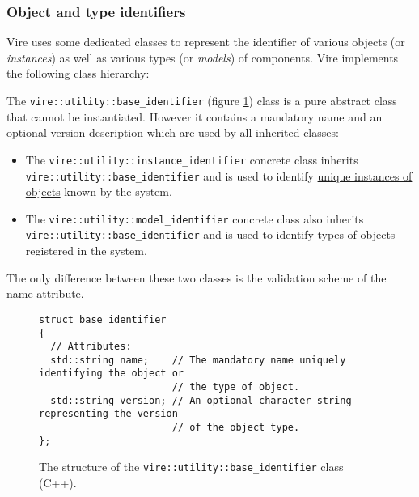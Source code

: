 \subsubsection{Object and type identifiers}

Vire  uses  some dedicated  classes  to  represent the  identifier  of
various objects  (or \emph{instances})  as well  as various  types (or
\emph{models})  of components.  Vire  implements  the following  class
hierarchy:

\begin{center}
\end{center}

The          \texttt{vire::utility::base\_identifier}          (figure
\ref{fig-app-payload-base_identifier}) class is  a pure abstract class
that cannot be instantiated. However  it contains a mandatory name and
an  optional  version description  which  are  used by  all  inherited
classes:

\begin{itemize}

\item The   \texttt{vire::utility::instance\_identifier}    concrete   class
inherits  \texttt{vire::utility::base\_identifier}  and   is  used  to
identify \underline{unique instances of objects} known by the system.

\item The  \texttt{vire::utility::model\_identifier}   concrete  class  also
inherits  \texttt{vire::utility::base\_identifier}  and   is  used  to
identify \underline{types of objects} registered in the system.

\end{itemize}

The only difference between these two classes is the validation scheme
of  the name  attribute.

\begin{figure}[h]
\vskip 10pt
\small
\begin{Verbatim}[frame=single,xleftmargin=0.cm,label=\fbox{C++}]
struct base_identifier
{
  // Attributes:
  std::string name;    // The mandatory name uniquely identifying the object or
                       // the type of object.
  std::string version; // An optional character string representing the version
                       // of the object type.
};
\end{Verbatim}
\normalsize
\caption{The structure of the \texttt{vire::utility::base\_identifier}
  class (C++).}
\label{fig-app-payload-base_identifier}
\end{figure}

